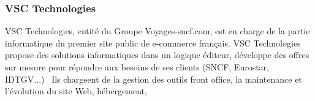 \subsubsection{VSC Technologies}
VSC Technologies, entité du Groupe Voyages-sncf.com,
est en charge de la partie informatique du premier site public de e-commerce français.
VSC Technologies propose des solutions informatiques dans un logique éditeur,
développe des offres sur mesure pour répondre aux besoins de ses clients (SNCF, Eurostar, IDTGV...) 
Ils chargeent de la gestion des outils front office, la maintenance et l'évolution du site Web, hébergement,

\clearpage
